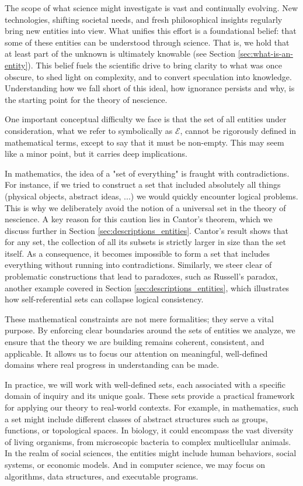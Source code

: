 The scope of what science might investigate is vast and continually evolving. New technologies, shifting societal needs, and fresh philosophical insights regularly bring new entities into view. What unifies this effort is a foundational belief: that some of these entities can be understood through science. That is, we hold that at least part of the unknown is ultimately knowable (see Section \ref{sec:what-is-an-entity}). This belief fuels the scientific drive to bring clarity to what was once obscure, to shed light on complexity, and to convert speculation into knowledge. Understanding how we fall short of this ideal, how ignorance persists and why, is the starting point for the theory of nescience.

One important conceptual difficulty we face is that the set of all entities under consideration, what we refer to symbolically as $\mathcal{E}$, cannot be rigorously defined in mathematical terms, except to say that it must be non-empty. This may seem like a minor point, but it carries deep implications.

In mathematics, the idea of a "set of everything" is fraught with contradictions. For instance, if we tried to construct a set that included absolutely all things (physical objects, abstract ideas, ...) we would quickly encounter logical problems. This is why we deliberately avoid the notion of a universal set in the theory of nescience. A key reason for this caution lies in Cantor's theorem, which we discuss further in Section \ref{sec:descriptions_entities}. Cantor's result shows that for any set, the collection of all its subsets is strictly larger in size than the set itself. As a consequence, it becomes impossible to form a set that includes everything without running into contradictions. Similarly, we steer clear of problematic constructions that lead to paradoxes, such as Russell's paradox, another example covered in Section \ref{sec:descriptions_entities}, which illustrates how self-referential sets can collapse logical consistency.

These mathematical constraints are not mere formalities; they serve a vital purpose. By enforcing clear boundaries around the sets of entities we analyze, we ensure that the theory we are building remains coherent, consistent, and applicable. It allows us to focus our attention on meaningful, well-defined domains where real progress in understanding can be made.

In practice, we will work with well-defined sets, each associated with a specific domain of inquiry and its unique goals. These sets provide a practical framework for applying our theory to real-world contexts. For example, in mathematics, such a set might include different classes of abstract structures such as groups, functions, or topological spaces. In biology, it could encompass the vast diversity of living organisms, from microscopic bacteria to complex multicellular animals. In the realm of social sciences, the entities might include human behaviors, social systems, or economic models. And in computer science, we may focus on algorithms, data structures, and executable programs.

